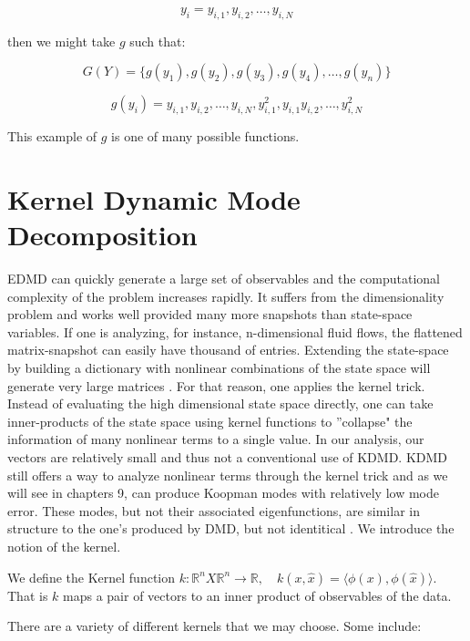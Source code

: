 $$
y_i = {y_{i,1}, y_{i,2},\dots, y_{i,N}} 
$$

\noindent then we might take $g$ such that:

$$
G(Y) = \{g(y_1), g(y_2), g(y_3), g(y_4), \dots , g(y_n)\}
$$

$$
g(y_i) = {y_{i,1}, y_{i,2},\dots, y_{i,N}, y^{2}_{i,1}, y_{i,1}y_{i,2}, \dots, y^{2}_{i,N}} 
$$

\noindent This example of $g$ is one of many possible functions.

\section{Kernel Dynamic Mode Decomposition}

EDMD can quickly generate a large set of observables
 and the computational complexity of the problem increases rapidly. It suffers from the
 dimensionality problem and works well provided many more snapshots than state-space
variables. If one is analyzing, for instance, n-dimensional fluid flows, the flattened matrix-snapshot
can easily have thousand of entries. Extending the state-space by building a dictionary with nonlinear combinations of the 
state space will generate very large matrices \cite{williams2015kernelbased}. For that reason, one applies the kernel trick. Instead of evaluating
the high dimensional state space directly, one can take inner-products of the state space using kernel functions
to ''collapse" the information of many nonlinear terms to a single value. In our analysis, our vectors are relatively small and thus not a conventional use of KDMD. 
 KDMD still offers a way to analyze nonlinear terms through the kernel trick and as we will see in chapters 9, can produce 
 Koopman modes with relatively low mode error. 
 These modes, but not their associated eigenfunctions, are similar in structure to the one's produced by DMD, but not identitical \cite{doi:10.1137/1.9781611974508}. 
We introduce the notion of the kernel.

\begin{dfn}
    We define the Kernel function $k:\mathbb{R}^n X \mathbb{R}^n \rightarrow \mathbb{R}, \quad k(x,{\hat x}) = \langle \phi(x), \phi({\hat x})\rangle$.
     That is $k$ maps a pair of vectors to an inner product of observables of the data.
\end{dfn}

\noindent There are a variety of different kernels that we may choose. Some include:

\vspace{3mm}

